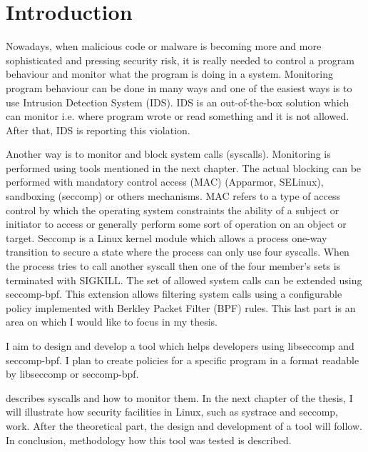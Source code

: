 


\chapter{Introduction}
Nowadays, when malicious code or malware is becoming more and more sophisticated and pressing security risk, it is really needed to control a program behaviour and monitor what the program is doing in a system.
Monitoring program behaviour can be done in many ways and one of the easiest ways is to use Intrusion Detection System (IDS).
IDS is an out-of-the-box solution which can monitor i.e. where program wrote or read something and it is not allowed.
After that, IDS is reporting this violation.

Another way is to monitor and block system calls (syscalls).
Monitoring is performed using tools mentioned in the next chapter.
The actual blocking can be performed with mandatory control access (MAC) (Apparmor, SELinux), sandboxing (seccomp) or others mechanisms.
MAC refers to a type of access control by which the operating system constraints the ability of a subject or initiator to access or generally perform some sort of operation on an object or target.
Seccomp is a Linux kernel module which allows a process one-way transition to secure a state where the process can only use four syscalls.
When the process tries to call another syscall then one of the four member's sets is terminated with SIGKILL.
The set of allowed system calls can be extended using seccomp-bpf.
This extension allows filtering system calls using a configurable policy implemented with Berkley Packet Filter (BPF) rules.
This last part is an area on which I would like to focus in my thesis.

I aim to design and develop a tool which helps developers using libseccomp and seccomp-bpf.
I plan to create policies for a specific program in a format readable by libseccomp or seccomp-bpf.

 describes syscalls and how to monitor them.
In the next chapter of the thesis, I will illustrate how security facilities in Linux, such as systrace and seccomp, work.
After the theoretical part, the design and development of a tool will follow.
In conclusion, methodology how this tool was tested is described.

